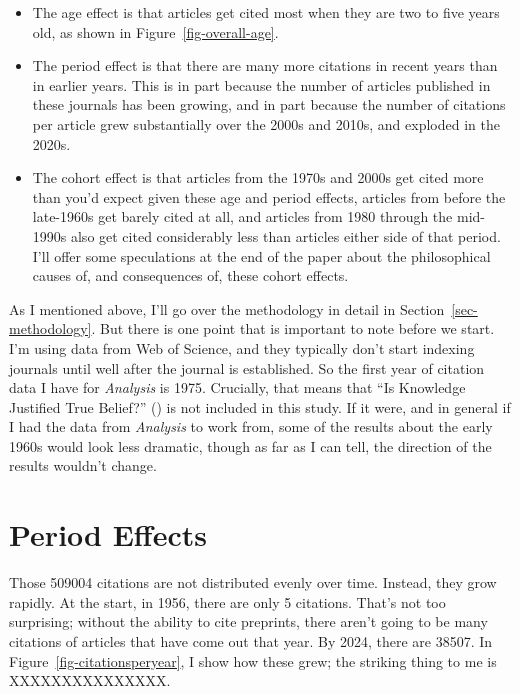\documentclass[
  12pt,
  letterpaper,
  DIV=11,
  numbers=noendperiod]{scrartcl}
\providecommand{\tightlist}{%
  \setlength{\itemsep}{0pt}\setlength{\parskip}{0pt}}
\begin{document}
\begin{itemize}
\tightlist
\item
  The age effect is that articles get cited most when they are two to
  five years old, as shown in Figure~\ref{fig-overall-age}.
\item
  The period effect is that there are many more citations in recent
  years than in earlier years. This is in part because the number of
  articles published in these journals has been growing, and in part
  because the number of citations per article grew substantially over
  the 2000s and 2010s, and exploded in the 2020s.
\item
  The cohort effect is that articles from the 1970s and 2000s get cited
  more than you'd expect given these age and period effects, articles
  from before the late-1960s get barely cited at all, and articles from
  1980 through the mid-1990s also get cited considerably less than
  articles either side of that period. I'll offer some speculations at
  the end of the paper about the philosophical causes of, and
  consequences of, these cohort effects.
\end{itemize}

As I mentioned above, I'll go over the methodology in detail in
Section~\ref{sec-methodology}. But there is one point that is important
to note before we start. I'm using data from Web of Science, and they
typically don't start indexing journals until well after the journal is
established. So the first year of citation data I have for
\emph{Analysis} is 1975. Crucially, that means that ``Is Knowledge
Justified True Belief?'' () is
not included in this study. If it were, and in general if I had the data
from \emph{Analysis} to work from, some of the results about the early
1960s would look less dramatic, though as far as I can tell, the
direction of the results wouldn't change.

\section{Period Effects}\label{sec-period}

Those 509004 citations are not distributed evenly over time. Instead,
they grow rapidly. At the start, in 1956, there are only 5 citations.
That's not too surprising; without the ability to cite preprints, there
aren't going to be many citations of articles that have come out that
year. By 2024, there are 38507. In Figure~\ref{fig-citationsperyear}, I
show how these grew; the striking thing to me is XXXXXXXXXXXXXXX.
\end{document}
